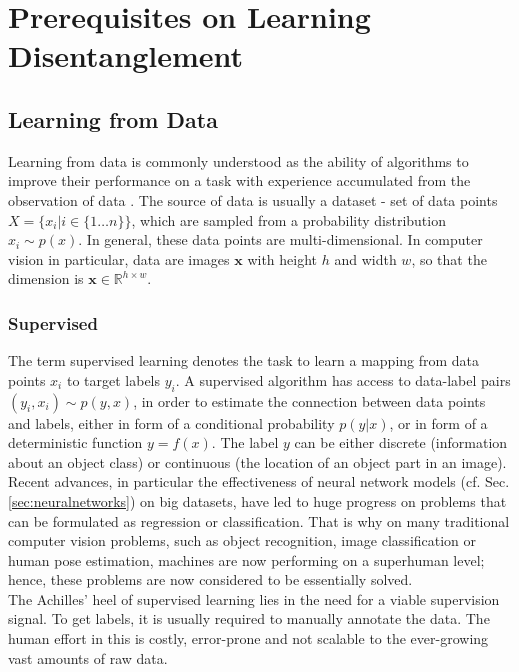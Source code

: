 \chapter{Prerequisites on Learning Disentanglement}\label{sec:prerequisites}



\section{Learning from Data}
	{Learning from data} is commonly understood as the ability of algorithms to improve their performance on a task with experience accumulated from the observation of data \cite{goodfellow16dlb}. The source of data is usually a dataset - set of data points $X = \{x_i | i \in \{1\ldots n\} \}$, which are sampled from a probability distribution $x_i \sim p(x)$.
	In general, these data points are multi-dimensional. In computer vision in particular, data are images $\mathbf{x}$ with height $h$ and width $w$, so that the dimension is $\mathbf{x} \in \mathbb{R}^{h \times w}$.

	\subsection{Supervised}\label{sec:supervised}
		The term {supervised learning} denotes the task to learn a mapping from data points $x_i$ to target labels $y_i$.
		A supervised algorithm has access to data-label pairs  $(y_i, x_i) \sim p(y, x)$, in order to estimate the connection between data points and labels, either in form of a conditional probability $p(y|x)$, or in form of a deterministic function $y = f(x)$.
		The label $y$ can be either discrete (\eg information about an object class) or continuous (\eg the location of an object part in an image).
		Recent advances, in particular the effectiveness of neural network models (cf. Sec. \ref{sec:neuralnetworks}) on big datasets, have led to huge progress on problems that can be formulated as regression or classification. That is why on many traditional computer vision problems, such as object recognition, image classification or human pose estimation, machines are now performing on a superhuman level; hence, these problems are now considered to be essentially solved.\\
		The Achilles' heel of supervised learning lies in the need for a viable supervision signal. To get labels, it is usually required to manually annotate the data. The human effort in this is costly, error-prone and not scalable to the ever-growing vast amounts of raw data.

